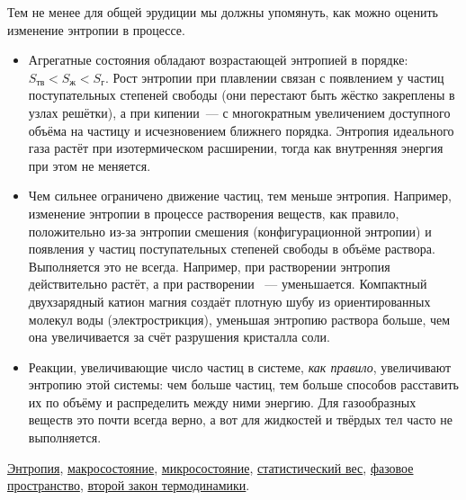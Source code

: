 Тем не менее для общей эрудиции мы должны упомянуть, как можно оценить изменение энтропии в процессе.

\begin{itemize}
    \item Агрегатные состояния обладают возрастающей энтропией в порядке: $S_{\text{тв}} < S_{\text{ж}} < S_{\text{г}}$. Рост энтропии при плавлении связан с появлением у частиц поступательных степеней свободы (они перестают быть жёстко закреплены в узлах решётки), а при кипении~--- с многократным увеличением доступного объёма на частицу и исчезновением ближнего порядка. Энтропия идеального газа растёт при изотермическом расширении, тогда как внутренняя энергия при этом не меняется.
    \item Чем сильнее ограничено движение частиц, тем меньше энтропия. Например, изменение энтропии в процессе растворения веществ, как правило, положительно из-за энтропии смешения (конфигурационной энтропии) и появления у частиц поступательных степеней свободы в объёме раствора. Выполняется это не всегда. Например, при растворении  энтропия действительно растёт, а при растворении ~--- уменьшается. Компактный двухзарядный катион магния создаёт плотную шубу из ориентированных молекул воды (электрострикция), уменьшая энтропию раствора больше, чем она увеличивается за счёт разрушения кристалла соли.
    \item Реакции, увеличивающие число частиц в системе, \emph{как правило}, увеличивают энтропию этой системы: чем больше частиц, тем больше способов расставить их по объёму и распределить между ними энергию. Для газообразных веществ это почти всегда верно, а вот для жидкостей и твёрдых тел часто не выполняется.
\end{itemize}

\begin{termlist}
    \hyperref[term:entropy]{Энтропия},
    \hyperref[term:macrostate]{макросостояние},
    \hyperref[term:microstate]{микросостояние},
    \hyperref[term:statistical_weight]{статистический вес},
    \hyperref[term:phase_space]{фазовое пространство},
    \hyperref[term:second_law_of_thermodynamics]{второй закон термодинамики}.
\end{termlist}

